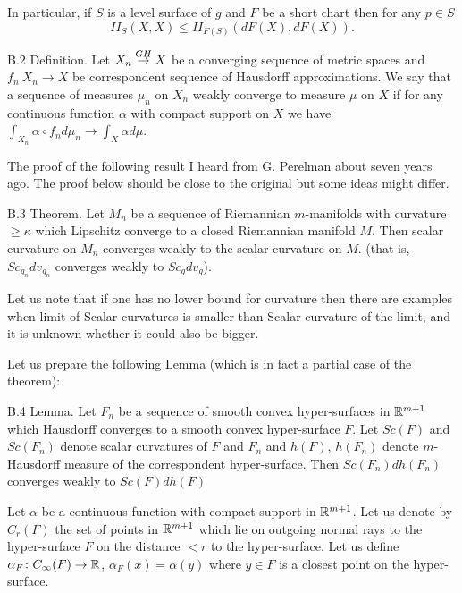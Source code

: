 \documentclass{article}
\begin{document}
In particular, if $S$ is a level surface of $g$ and $F$ be a short
chart then for any $p\in S$
$$I\!I_S(X,X)\le I\!I_{F(S)}(dF(X),dF(X)).$$


\begin{thm}{B.2 Definition.} Let $X_n \buildrel {GH} \over \rightarrow X$ be a
converging sequence of metric spaces and $f_n\:X_n\to X$ be correspondent
sequence of Hausdorff approximations.
We say that a sequence of measures $\mu_n$ on $X_n$ weakly converge to
measure $\mu$ on $X$ if for any continuous function $\alpha$ with compact
support on $X$ we have $\int_{X_n} \alpha\circ f_nd\mu_n\to \int_{X} \alpha d\mu$.
\end{thm}


The proof of the following result I heard from G. Perelman about
seven years ago. The proof below should be close to the original
but some ideas might differ.


\begin{thm}{B.3 Theorem.} Let $M_n$ be a sequence of Riemannian $m$-manifolds with curvature
$\ge \kappa$ which Lipschitz converge to a closed Riemannian manifold $M$.
Then scalar curvature on $M_n$ converges weakly to the scalar curvature on $M$.
(that is, $Sc_{g_n}dv_{g_n}$ converges weakly to $Sc_{g}dv_{g}$).
\end{thm}


Let us note that if one has no lower bound for curvature then
there are examples when limit of Scalar curvatures is smaller than
Scalar curvature of the limit, and it is unknown whether it could
also be bigger.


Let us prepare the following Lemma (which is in fact a partial case of the theorem):


\begin{thm}{B.4 Lemma.}
 Let $F_n$ be a sequence of smooth convex hyper-surfaces in $\mathbb{R}^{m+1}$ which Hausdorff converges to a smooth convex hyper-surface $F$.
 Let $Sc(F)$ and $Sc(F_n)$ denote scalar curvatures of $F$ and $F_n$
and $h(F)$, $h(F_n)$ denote $m$-Hausdorff measure of the
correspondent hyper-surface. Then $Sc(F_n)dh(F_n)$ converges weakly to $Sc(F)dh(F)$
\end{thm}


 Let $\alpha$ be a continuous function
with compact support in $\mathbb{R}^{m+1}$. Let us denote by $C_r(F)$ the
set of points in $\mathbb{R}^{m+1}$ which lie on outgoing normal rays to
the hyper-surface $F$ on the distance $< r$ to the hyper-surface.
Let us define $\alpha_F\colon C_\infty(F)\to \mathbb{R}$,
$\alpha_F(x)=\alpha(y)$ where $y\in F$ is a closest point on the
hyper-surface.
\end{document}
